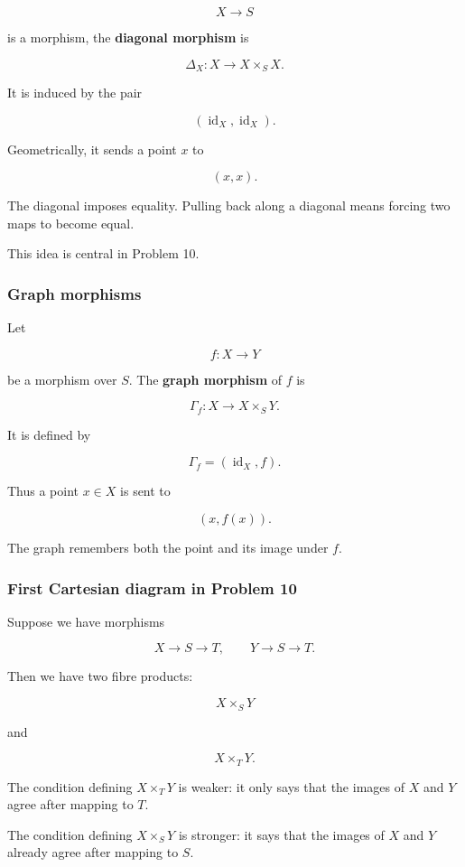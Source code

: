 \documentclass[12pt,a4paper]{article}
\theoremstyle{notespace}
\begin{document}
\[
X\to S
\]

is a morphism, the \textbf{diagonal morphism} is

\[
\Delta_X:X\to X\times_S X.
\]

It is induced by the pair

\[
(\operatorname{id}_X,\operatorname{id}_X).
\]

Geometrically, it sends a point \(x\) to

\[
(x,x).
\]

The diagonal imposes equality. Pulling back along a diagonal means forcing two maps to become equal.

This idea is central in Problem 10.

\subsubsection{Graph morphisms}

Let

\[
f:X\to Y
\]

be a morphism over \(S\). The \textbf{graph morphism} of \(f\) is

\[
\Gamma_f:X\to X\times_S Y.
\]

It is defined by

\[
\Gamma_f=(\operatorname{id}_X,f).
\]

Thus a point \(x\in X\) is sent to

\[
(x,f(x)).
\]

The graph remembers both the point and its image under \(f\).

\subsubsection{First Cartesian diagram in Problem 10}

Suppose we have morphisms

\[
X\to S\to T,
\qquad
Y\to S\to T.
\]

Then we have two fibre products:

\[
X\times_S Y
\]

and

\[
X\times_T Y.
\]

The condition defining \(X\times_T Y\) is weaker: it only says that the images of \(X\) and \(Y\) agree after mapping to \(T\).

The condition defining \(X\times_S Y\) is stronger: it says that the images of \(X\) and \(Y\) already agree after mapping to \(S\).
\end{document}
